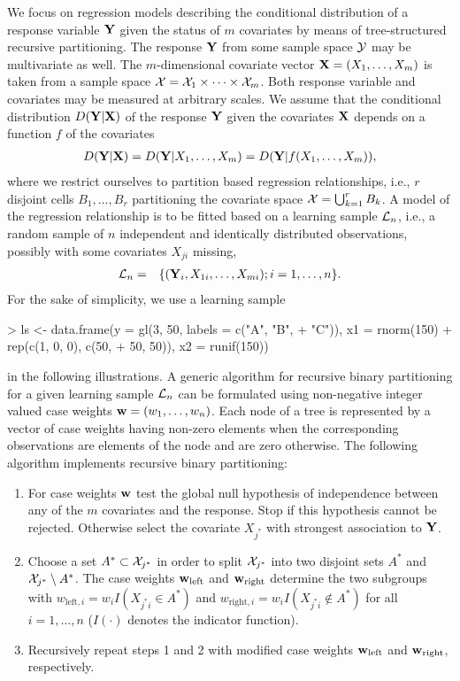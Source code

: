 \documentclass[letter]{article}
\begin{document}
We focus on regression models describing the conditional distribution of a
response variable $\mathbf{Y}$ given the status of $m$ covariates by
means of tree-structured recursive partitioning. The response $\mathbf{Y}$ from some
sample space $\mathcal{Y}$ may be multivariate as well. 
The $m$-dimensional covariate vector $\mathbf{X} = (X_1, \dots, X_m)$ is taken 
from a sample space $\mathcal{X} = \mathcal{X}_1 \times \cdots \times \mathcal{X}_m$.
Both response variable and covariates may be measured
at arbitrary scales.
We assume that the conditional distribution $D(\mathbf{Y} | \mathbf{X})$ of the response 
$\mathbf{Y}$ given the covariates $\mathbf{X}$ depends on a function $f$ of the covariates
\begin{eqnarray*} 
D(\mathbf{Y} | \mathbf{X}) = D(\mathbf{Y} | X_1, \dots, X_m) = D(\mathbf{Y} | f( X_1, \dots,
X_m)),
\end{eqnarray*}
where we restrict ourselves to partition based regression relationships,
i.e., $r$ disjoint cells $B_1, \dots, B_r$ partitioning the covariate space $\mathcal{X}
= \bigcup_{k = 1}^r B_k$.
A model of the regression relationship is to be fitted based on a learning 
sample $\mathcal{L}_n$, i.e., a random sample of $n$ independent and
identically distributed observations, possibly with some covariates $X_{ji}$
missing,
\begin{eqnarray*}
\mathcal{L}_n & = & \{ (\mathbf{Y}_i, X_{1i}, \dots, X_{mi}); i = 1, \dots, n \}.
\end{eqnarray*}
For the sake of simplicity, we use a learning sample
\begin{Schunk}
\begin{Sinput}
> ls <- data.frame(y = gl(3, 50, labels = c("A", "B", 
+     "C")), x1 = rnorm(150) + rep(c(1, 0, 0), c(50, 
+     50, 50)), x2 = runif(150))
\end{Sinput}
\end{Schunk}
in the following illustrations.
A generic algorithm for recursive binary partitioning for a given learning
sample $\mathcal{L}_n$ can be formulated using non-negative integer valued case weights $\mathbf{w}
= (w_1, \dots, w_n)$. Each node of a tree is represented by a vector of
case weights having non-zero elements when the corresponding observations
are elements of the node and are zero otherwise. The following algorithm
implements recursive binary partitioning:
\begin{enumerate}
\item For case weights $\mathbf{w}$ test the global null hypothesis of independence between
      any of the $m$ covariates and the response. Stop if this 
      hypothesis cannot be rejected. 
      Otherwise select the covariate $X_{j^*}$ with strongest 
      association to $\mathbf{Y}$.
\item Choose a set $A^* \subset \mathcal{X}_{j^*}$ in order to split $\mathcal{X}_{j^*}$ into
      two disjoint sets $A^*$ and $\mathcal{X}_{j^*} \setminus A^*$. 
      The case weights $\mathbf{w}_\text{left}$ and $\mathbf{w}_\text{right}$ determine the
      two subgroups with $w_{\text{left},i} = w_i I(X_{j^*i} \in A^*)$ and 
      $w_{\text{right},i} = w_i I(X_{j^*i} \not\in A^*)$ for all $i = 1,
      \dots, n$ ($I(\cdot)$ denotes the indicator function).
\item Recursively repeat steps 1 and 2 with modified case weights 
      $\mathbf{w}_\text{left}$ and $\mathbf{w}_\text{right}$, respectively.
\end{enumerate}
\end{document}
